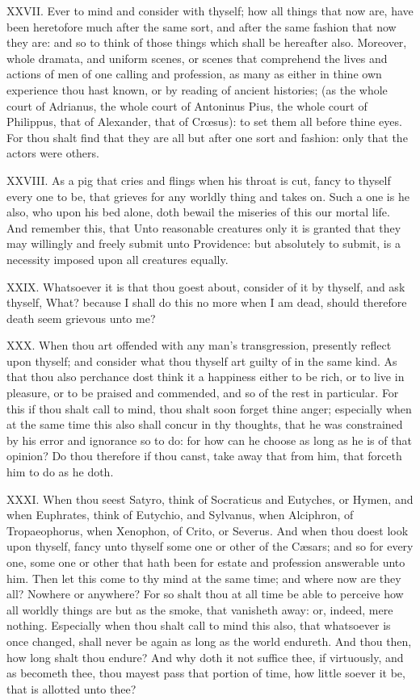 XXVII. Ever to mind and consider with thyself; how all things that now
are, have been heretofore much after the same sort, and after the same
fashion that now they are: and so to think of those things which shall be
hereafter also. Moreover, whole dramata, and uniform scenes, or scenes
that comprehend the lives and actions of men of one calling and
profession, as many as either in thine own experience thou hast known, or
by reading of ancient histories; (as the whole court of Adrianus, the
whole court of Antoninus Pius, the whole court of Philippus, that of
Alexander, that of Crœsus): to set them all before thine eyes. For thou
shalt find that they are all but after one sort and fashion: only that the
actors were others.

XXVIII. As a pig that cries and flings when his throat is cut, fancy to
thyself every one to be, that grieves for any worldly thing and takes on.
Such a one is he also, who upon his bed alone, doth bewail the miseries of
this our mortal life. And remember this, that Unto reasonable creatures
only it is granted that they may willingly and freely submit unto
Providence: but absolutely to submit, is a necessity imposed upon all
creatures equally.

XXIX. Whatsoever it is that thou goest about, consider of it by thyself,
and ask thyself, What? because I shall do this no more when I am dead,
should therefore death seem grievous unto me?

XXX. When thou art offended with any man's transgression, presently
reflect upon thyself; and consider what thou thyself art guilty of in the
same kind. As that thou also perchance dost think it a happiness either to
be rich, or to live in pleasure, or to be praised and commended, and so of
the rest in particular. For this if thou shalt call to mind, thou shalt
soon forget thine anger; especially when at the same time this also shall
concur in thy thoughts, that he was constrained by his error and ignorance
so to do: for how can he choose as long as he is of that opinion? Do thou
therefore if thou canst, take away that from him, that forceth him to do
as he doth.

XXXI. When thou seest Satyro, think of Socraticus and Eutyches, or
Hymen, and when Euphrates, think of Eutychio, and Sylvanus, when
Alciphron, of Tropaeophorus, when Xenophon, of Crito, or Severus. And when
thou doest look upon thyself, fancy unto thyself some one or other of the
Cæsars; and so for every one, some one or other that hath been for estate
and profession answerable unto him. Then let this come to thy mind at the
same time; and where now are they all? Nowhere or anywhere? For so shalt
thou at all time be able to perceive how all worldly things are but as the
smoke, that vanisheth away: or, indeed, mere nothing. Especially when thou
shalt call to mind this also, that whatsoever is once changed, shall never
be again as long as the world endureth. And thou then, how long shalt thou
endure? And why doth it not suffice thee, if virtuously, and as becometh
thee, thou mayest pass that portion of time, how little soever it be, that
is allotted unto thee?

